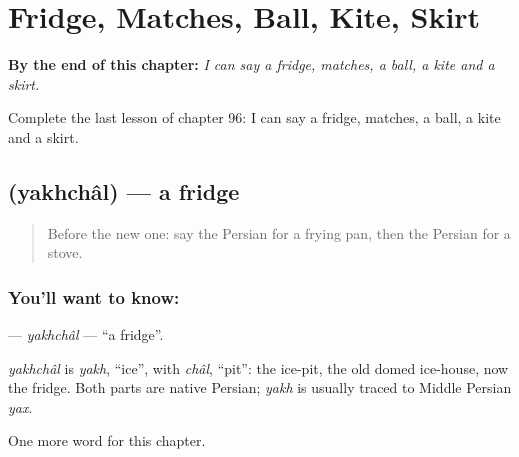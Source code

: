 
\chapter{Fridge, Matches, Ball, Kite, Skirt}
\label{ch:fa-fridge-matches-ball-kite-skirt}

\begin{chapteropening}
\textbf{By the end of this chapter:} \emph{I can say a fridge, matches, a ball, a kite and a skirt.}

Complete the last lesson of chapter 96: I can say a fridge, matches, a ball, a kite and a skirt.
\end{chapteropening}

\section[\texorpdfstring{\fa{یخچال} (yakhchâl)}{یخچال (yakhchâl)}]{ (yakhchâl) — a fridge}

\label{lesson:FA-C96-yakhchal}



\begin{quote}
Before the new one: say the Persian for a frying pan, then the Persian for a stove.
\end{quote}

\subsection*{You'll want to know: }
\textbf{} — \emph{yakhchâl} — \textquotedblleft{}a fridge\textquotedblright{}.

\begin{cousinweb}
\emph{yakhchâl} is \emph{yakh}, \textquotedblleft{}ice\textquotedblright{}, with \emph{châl}, \textquotedblleft{}pit\textquotedblright{}: the ice-pit, the old domed ice-house, now the fridge. Both parts are native Persian; \emph{yakh} is usually traced to Middle Persian \emph{yax}.
\end{cousinweb}

\begin{grammarlens}[title={What you've built}]
One more word for this chapter.
\end{grammarlens}

